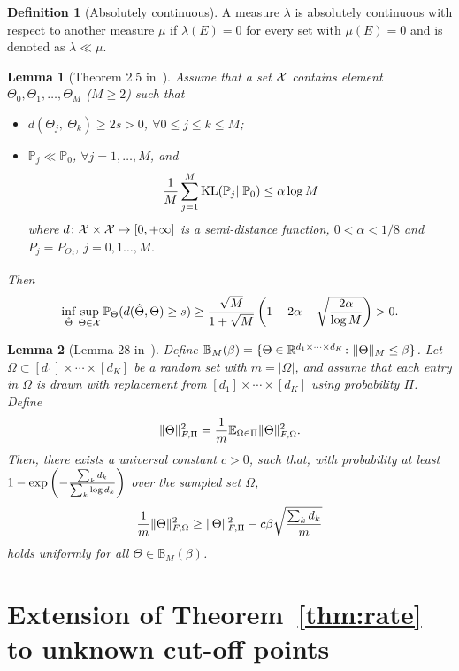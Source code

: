 \documentclass[11pt]{article}
\theoremstyle{plain}
\newtheorem{lem}{Lemma}
\theoremstyle{definition}
\newtheorem{defn}{Definition}
\begin{document}
\begin{defn}[Absolutely continuous]
A measure $\lambda$ is absolutely continuous with respect to another measure $\mu$ if $\lambda(E)=0$ for every set with $\mu(E)=0$ and is denoted as $\lambda\ll\mu$.
\end{defn}


\begin{lem}[Theorem 2.5 in~\cite{tsybakov2009introduction}]\label{lem:Tsybakov}
Assume that a set $\mathcal{X}$ contains element $\Theta_0, \Theta_1, \ldots,\Theta_M$ ($M\geq 2$) such that
\begin{itemize}
\item $d(\Theta_j,\ \Theta_k)\geq 2s>0$, $\forall 0\leq j\leq k\leq M$;
\item $\mathbb{P}_j\ll\mathbb{P}_0$, $\forall j=1,\ldots,M$, and
\[
{1\over M}\sum_{j=1}^M \mathrm{KL}(\mathbb{P}_j||\mathbb{P}_0)\leq \alpha \log M
\]
where $d\colon \mathcal{X}\times \mathcal{X}\mapsto [0,+\infty]$ is a semi-distance function, $0<\alpha<{1/8}$ and $P_j=P_{\Theta_j}$, $j=0,1\ldots,M$.
\end{itemize}
Then
\[
\inf_{\hat \Theta}\sup_{\Theta\in\mathcal{X}} \mathbb{P}_{\Theta}(d(\hat \Theta, \Theta)\geq s)\geq {\sqrt{M}\over 1+\sqrt{M}}\left(1-2\alpha-\sqrt{2\alpha\over \log M} \right)>0.
\]
\end{lem}

\begin{lem}[Lemma 28 in~\cite{ghadermarzy2019near}]\label{lem:convexity}
Define $\mathbb{B}_{M}(\beta)=\{\Theta\in \mathbb{R}^{d_1\times \cdots \times d_K}\colon \lVert\Theta\rVert_M\leq \beta \}$.  Let $\Omega\subset[d_1]\times\cdots \times [d_K]$ be a random set with $m=|\Omega|$, and assume that each entry in $\Omega$ is drawn with replacement from $[d_1]\times\cdots\times[d_K]$ using probability $\Pi$. Define
\[
\lVert\Theta\rVert_{F,\Pi}^2={1\over m}\mathbb{E}_{\Omega\in\Pi}\lVert\Theta\rVert_{F,\Omega}^2.
\]
Then, there exists a universal constant $c>0$, such that, with probability at least $1-\exp\left(-{\sum_kd_k \over \sum_k \log d_k} \right)$ over the sampled set $\Omega$,
\[
{1\over m}\lVert\Theta\rVert_{F,\Omega}^2 \geq \lVert\Theta\rVert_{F,\Pi}^2-c\beta\sqrt{\sum_k d_k\over m}
\]
holds uniformly for all $\Theta\in\mathbb{B}_M(\beta)$.
\end{lem}


\section{Extension of Theorem~\ref{thm:rate} to unknown cut-off points}
\end{document}
